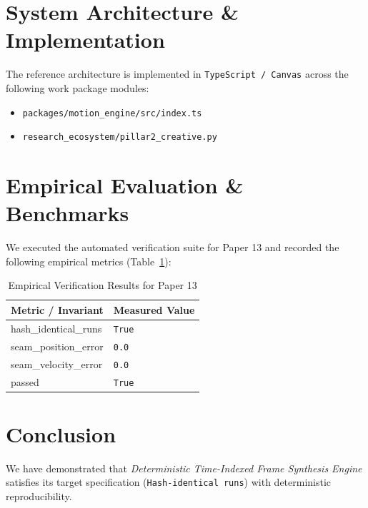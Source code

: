 \documentclass[10pt,twocolumn]{article}
\begin{document}
\section{System Architecture \& Implementation}
The reference architecture is implemented in \texttt{TypeScript / Canvas} across the following work package modules:
\begin{itemize}
  \item \texttt{packages/motion\_engine/src/index.ts}
  \item \texttt{research\_ecosystem/pillar2\_creative.py}
\end{itemize}

\section{Empirical Evaluation \& Benchmarks}
We executed the automated verification suite for Paper 13 and recorded the following empirical metrics (Table~\ref{tab:metrics}):

\begin{table}[htbp]
\centering
\caption{Empirical Verification Results for Paper 13}
\label{tab:metrics}
\begin{tabular}{ll}
\toprule
\textbf{Metric / Invariant} & \textbf{Measured Value} \\
\midrule
    hash\_identical\_runs & \texttt{True} \\
    seam\_position\_error & \texttt{0.0} \\
    seam\_velocity\_error & \texttt{0.0} \\
    passed & \texttt{True} \\
\bottomrule
\end{tabular}
\end{table}

\section{Conclusion}
We have demonstrated that \textit{Deterministic Time-Indexed Frame Synthesis Engine} satisfies its target specification (\texttt{Hash-identical runs}) with deterministic reproducibility.



\end{document}
